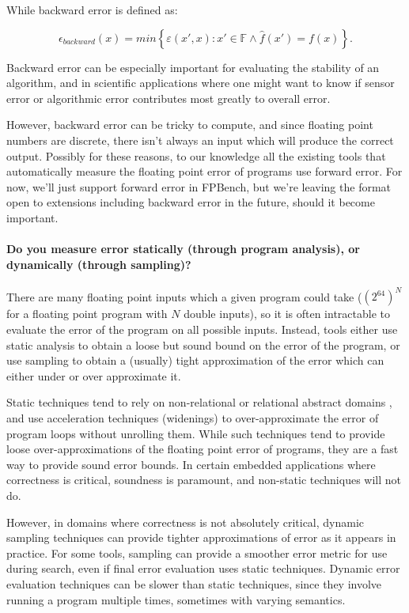 \documentclass[main.tex]{subfiles}
\begin{document}
While backward error is defined as:

\begin{equation}
  \epsilon_{backward}(x) = min \left\{\varepsilon(x', x) : x' \in \mathbb{F} \land \hat{f}(x') = f(x)\right\} .
\end{equation}

Backward error can be especially important for
evaluating the stability of an algorithm, and in scientific
applications where one might want to know if sensor error or
algorithmic error contributes most greatly to overall error.

However, backward error can be tricky to compute, and since floating
point numbers are discrete, there isn't always an input which will
produce the correct output. Possibly for these reasons, to our
knowledge all the existing tools that automatically measure the
floating point error of programs use forward error. For now, we'll
just support forward error in FPBench, but we're leaving the format
open to extensions including backward error in the future, should it
become important.

\paragraph{Do you measure error statically (through program analysis), or
  dynamically (through sampling)?}

There are many floating point inputs which a given program could take
($\left(2^{64}\right)^N$ for a floating point program with $N$ double inputs), so
it is often intractable to evaluate the error of the program on all
possible inputs. Instead, tools either use static analysis to obtain a
loose but sound bound on the error of the program, or use sampling to
obtain a (usually) tight approximation of the error which can either
under or over approximate it.

Static techniques tend to rely on non-relational \cite{} or relational
abstract domains \cite{}, and use acceleration techniques (widenings)
to over-approximate the error of program loops without unrolling
them. While such techniques tend to provide loose over-approximations
of the floating point error of programs, they are a fast way to
provide sound error bounds. In certain embedded applications where
correctness is critical, soundness is paramount, and non-static
techniques will not do.

However, in domains where correctness is not absolutely critical,
dynamic sampling techniques can provide tighter approximations of
error as it appears in practice. For some tools, sampling can provide
a smoother error metric for use during search, even if final error
evaluation uses static techniques. Dynamic error evaluation techniques
can be slower than static techniques, since they involve running a
program multiple times, sometimes with varying semantics.
\end{document}
